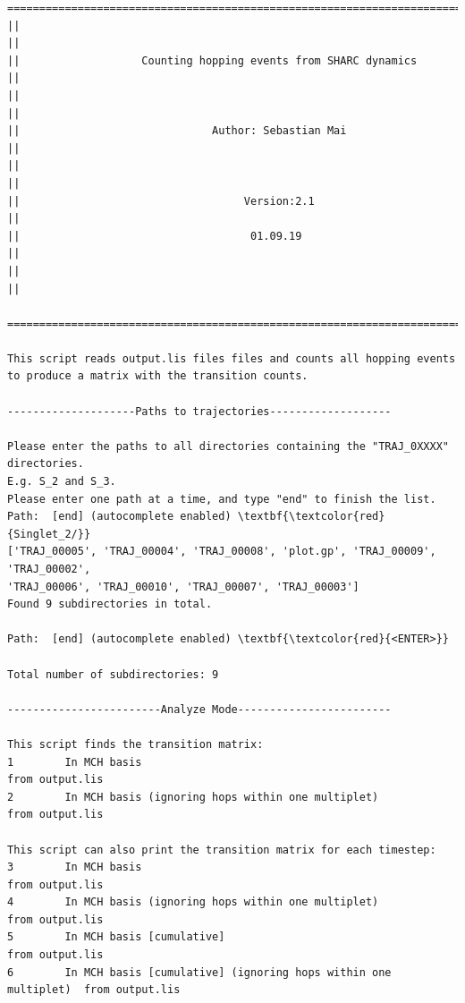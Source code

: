 \documentclass[a4paper,11pt,DIV=15,openany]{scrbook}
\begin{document}
\begin{oframed}
\footnotesize\begin{Verbatim}[commandchars=\\\{\}]
  ================================================================================
||                                                                                ||
||                   Counting hopping events from SHARC dynamics                  ||
||                                                                                ||
||                              Author: Sebastian Mai                             ||
||                                                                                ||
||                                   Version:2.1                                  ||
||                                    01.09.19                                    ||
||                                                                                ||
  ================================================================================

This script reads output.lis files files and counts all hopping events
to produce a matrix with the transition counts.
  
--------------------Paths to trajectories-------------------

Please enter the paths to all directories containing the "TRAJ_0XXXX" directories.
E.g. S_2 and S_3. 
Please enter one path at a time, and type "end" to finish the list.
Path:  [end] (autocomplete enabled) \textbf{\textcolor{red}{Singlet_2/}}
['TRAJ_00005', 'TRAJ_00004', 'TRAJ_00008', 'plot.gp', 'TRAJ_00009', 'TRAJ_00002', 
'TRAJ_00006', 'TRAJ_00010', 'TRAJ_00007', 'TRAJ_00003']
Found 9 subdirectories in total.

Path:  [end] (autocomplete enabled) \textbf{\textcolor{red}{<ENTER>}}

Total number of subdirectories: 9

------------------------Analyze Mode------------------------

This script finds the transition matrix:
1        In MCH basis                                                    from output.lis
2        In MCH basis (ignoring hops within one multiplet)               from output.lis

This script can also print the transition matrix for each timestep:
3        In MCH basis                                                    from output.lis
4        In MCH basis (ignoring hops within one multiplet)               from output.lis
5        In MCH basis [cumulative]                                       from output.lis
6        In MCH basis [cumulative] (ignoring hops within one multiplet)  from output.lis


\end{Verbatim}
\end{oframed}
\end{document}
